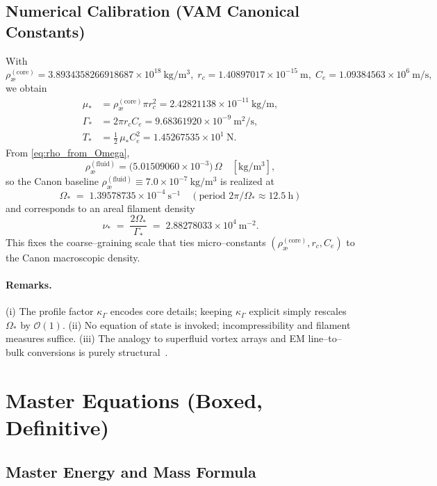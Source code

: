 \documentclass[11pt, a4paper]{article}
\begin{document}
\subsection{Numerical Calibration (VAM Canonical Constants)}
With
\[
    \rho_{\text{\ae}}^{(\text{core})}=3.8934358266918687\times10^{18}\ \mathrm{kg/m^3},\;
    r_c=1.40897017\times10^{-15}\ \mathrm{m},\;
    C_e=1.09384563\times10^{6}\ \mathrm{m/s},
\]
we obtain
\begin{align*}
    \mu_\ast &= \rho_{\text{\ae}}^{(\text{core})}\pi r_c^2
    = 2.42821138\times10^{-11}\ \mathrm{kg/m},\\
    \Gamma_\ast &= 2\pi r_c C_e
    = 9.68361920\times10^{-9}\ \mathrm{m^2/s},\\
    T_\ast &= \tfrac12\,\mu_\ast C_e^2
    = 1.45267535\times10^{1}\ \mathrm{N}.
\end{align*}
From \eqref{eq:rho_from_Omega},
\[
    \rho_{\text{\ae}}^{(\text{fluid})}
    = \bigl(5.01509060\times10^{-3}\bigr)\,\Omega\quad [\mathrm{kg/m^3}],
\]
so the Canon baseline \( \rho_{\text{\ae}}^{(\text{fluid})}\equiv 7.0\times10^{-7}\ \mathrm{kg/m^3}\) is realized at
\[
    \boxed{\;
    \Omega_\ast \;=\; 1.39578735\times10^{-4}\ \mathrm{s^{-1}}
    \quad (\text{period } 2\pi/\Omega_\ast \approx 12.5\ \mathrm{h})
    \;}
\]
and corresponds to an areal filament density
\[
    \nu_\ast \;=\; \frac{2\Omega_\ast}{\Gamma_\ast}
    \;=\; 2.88278033\times10^{4}\ \mathrm{m^{-2}}.
\]
This fixes the coarse–graining scale that ties micro–constants \((\rho_{\text{\ae}}^{(\text{core})}, r_c, C_e)\) to the Canon macroscopic density.

\paragraph{Remarks.}
(i) The profile factor \(\kappa_\Gamma\) encodes core details; keeping \(\kappa_\Gamma\) explicit simply rescales \(\Omega_\ast\) by \(\mathcal{O}(1)\). (ii) No equation of state is invoked; incompressibility and filament measures suffice. (iii) The analogy to superfluid vortex arrays and EM line–to–bulk conversions is purely structural~\cite{Feynman1955,Donnelly1991,Jackson1999,Saffman1992}.



\section{Master Equations (Boxed, Definitive)}

\subsection{Master Energy and Mass Formula}
\end{document}
